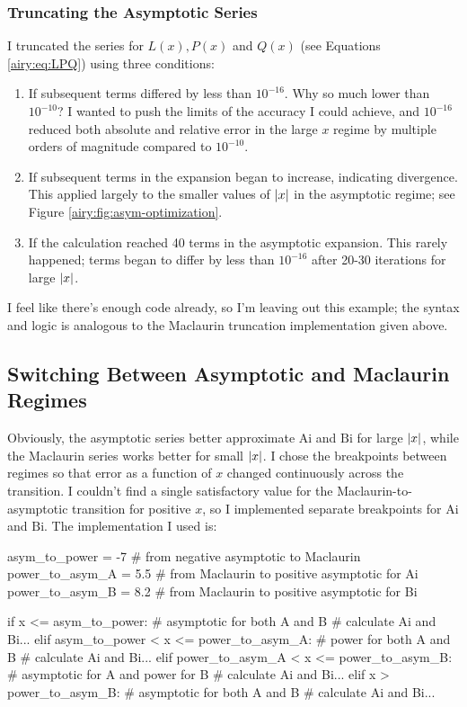 \documentclass[11pt, a4paper]{article}
\newcommand{\Ai}{\mathrm{Ai}}
\newcommand{\Bi}{\mathrm{Bi}}
\begin{document}
\subsubsection{Truncating the Asymptotic Series}
I truncated the series for $ L(x), P(x) $ and $ Q(x) $ (see Equations \ref{airy:eq:LPQ}) using three conditions:
\begin{enumerate}
	\item If subsequent terms differed by less than $ 10^{-16} $. Why so much lower than $ 10^{-10} $? I wanted to push the limits of the accuracy I could achieve, and $ 10^{-16} $ reduced both absolute and relative error in the large $ x $ regime by multiple orders of magnitude compared to $ 10^{-10} $.
	
	\item If subsequent terms in the expansion began to increase, indicating divergence. This applied largely to the smaller values of $ \abs{x} $ in the asymptotic regime; see Figure \ref{airy:fig:asym-optimization}.
	
	\item If the calculation reached 40 terms in the asymptotic expansion. This rarely happened; terms began to differ by less than $ 10^{-16} $ after 20-30 iterations for large $ \abs{x} $. 

\end{enumerate}
I feel like there's enough code already, so I'm leaving out this example; the syntax and logic is analogous to the Maclaurin truncation implementation given above.

\subsection{Switching Between Asymptotic and Maclaurin Regimes}
Obviously, the asymptotic series better approximate $ \Ai $ and $ \Bi $ for large $ \abs{x} $, while the Maclaurin series works better for small $ \abs{x} $. I chose the breakpoints between regimes so that error as a function of $ x $ changed continuously across the transition. I couldn't find a single satisfactory value for the Maclaurin-to-asymptotic transition for positive $ x $, so I implemented separate breakpoints for $ \Ai $ and $ \Bi $. The implementation I used is:
\begin{myminted}
asym_to_power = -7     # from negative asymptotic to Maclaurin
power_to_asym_A = 5.5  # from Maclaurin to positive asymptotic for Ai
power_to_asym_B = 8.2  # from Maclaurin to positive asymptotic for Bi

if x <= asym_to_power:                         # asymptotic for both A and B
    # calculate Ai and Bi...
elif asym_to_power < x <= power_to_asym_A:     # power for both A and B
	# calculate Ai and Bi...
elif power_to_asym_A < x <= power_to_asym_B:   # asymptotic for A and power for B
    # calculate Ai and Bi...
elif x > power_to_asym_B:                      # asymptotic for both A and B
    # calculate Ai and Bi...

\end{myminted}
\end{document}
